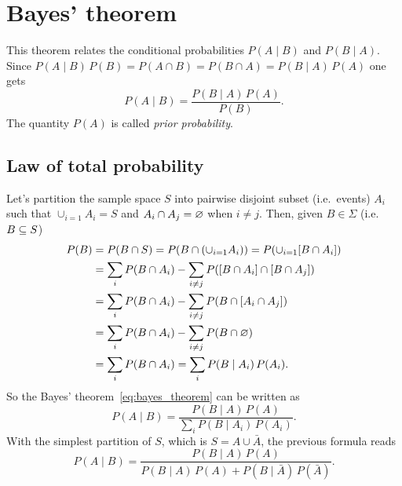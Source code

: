 \section{Bayes' theorem}

This theorem relates the conditional probabilities $P(A\mid B)$ and $P(B\mid A)$.
Since $P(A\mid B)\,P(B) = P(A\cap B) = P(B\cap A) = P(B\mid A)\,P(A)$ one gets
\begin{equation}\label{eq:bayes_theorem}
	P(A\mid B) = \frac{P(B\mid A)\,P(A)}{P(B)}.
\end{equation}
The quantity $P(A)$ is called \emph{prior probability}.

\subsection{Law of total probability}

Let's partition the sample space $S$ into pairwise disjoint subset (i.e.~events) $A_i$ such that $\cup_{i=1} A_i = S$ and $A_i\cap A_j = \varnothing$ when $i\neq j$.
Then, given $B\in\Sigma$ (i.e.~$B\subseteq S$)
\begin{equation}
	\begin{aligned}
		P(B)
		&= P(B\cap S) = P(B\cap (\cup_{i=1} A_i) )= P( \cup_{i=1}[B\cap A_i] )\\
  &=\sum_iP(B\cap A_i) - \sum_{i\neq j} P([B\cap A_i]\cap[B\cap A_j])\\
  &=\sum_iP(B\cap A_i) - \sum_{i\neq j} P(B\cap [A_i\cap A_j])\\
  &=\sum_iP(B\cap A_i) - \sum_{i\neq j} P(B\cap \varnothing)\\
  &=\sum_iP(B\cap A_i) =\sum_iP(B\mid A_i)\,P(A_i).
	\end{aligned}
\end{equation}
So the Bayes' theorem~\eqref{eq:bayes_theorem} can be written as 
\begin{equation}
	P(A\mid B) = \frac{P(B\mid A)\,P(A)}{\sum_iP(B\mid A_i)\,P(A_i)}.
\end{equation}
With the simplest partition of $S$, which is $S=A\cup\bar A$, the previous formula reads
\begin{equation}
	P(A\mid B) = \frac{P(B\mid A)\,P(A)}{P(B\mid A)\,P(A) + P(B\mid \bar A)\,P(\bar A)}.
\end{equation}

